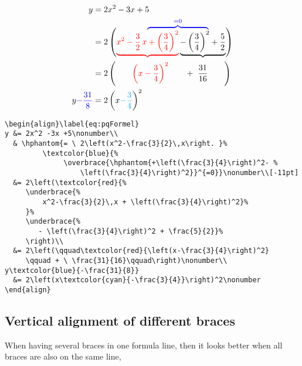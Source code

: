 \begin{table}[htb]
\begin{align}\label{eq:pqFormel}
y &= 2x^2 -3x +5\nonumber\\
  & \hphantom{= \ 2\left(x^2-\frac{3}{2}\,x\right. }%
         \textcolor{blue}{%
              \overbrace{\hphantom{+\left(\frac{3}{4}\right)^2- %
                  \left(\frac{3}{4}\right)^2}}^{=0}}\nonumber\\[-11pt]
  &= 2\left(\textcolor{red}{%
     \underbrace{%
         x^2-\frac{3}{2}\,x + \left(\frac{3}{4}\right)^2}%
     }%
     \underbrace{%
        - \left(\frac{3}{4}\right)^2 + \frac{5}{2}}%
     \right)\\
  &= 2\left(\qquad\textcolor{red}{\left(x-\frac{3}{4}\right)^2}
     \qquad + \ \frac{31}{16}\qquad\right)\nonumber\\
y\textcolor{blue}{-\frac{31}{8}}
  &= 2\left(x\textcolor{cyan}{-\frac{3}{4}}\right)^2\nonumber
\end{align}

\medskip%
\begin{lstlisting}
\begin{align}\label{eq:pqFormel}
y &= 2x^2 -3x +5\nonumber\\
  & \hphantom{= \ 2\left(x^2-\frac{3}{2}\,x\right. }%
         \textcolor{blue}{%
              \overbrace{\hphantom{+\left(\frac{3}{4}\right)^2- %
                  \left(\frac{3}{4}\right)^2}}^{=0}}\nonumber\\[-11pt]
  &= 2\left(\textcolor{red}{%
     \underbrace{%
         x^2-\frac{3}{2}\,x + \left(\frac{3}{4}\right)^2}%
     }%
     \underbrace{%
        - \left(\frac{3}{4}\right)^2 + \frac{5}{2}}%
     \right)\\
  &= 2\left(\qquad\textcolor{red}{\left(x-\frac{3}{4}\right)^2}
     \qquad + \ \frac{31}{16}\qquad\right)\nonumber\\
y\textcolor{blue}{-\frac{31}{8}}
  &= 2\left(x\textcolor{cyan}{-\frac{3}{4}}\right)^2\nonumber
\end{align}
\end{lstlisting}

\subsection[Vertical alignment]{Vertical alignment of different braces}
When having several braces in one formula line, then it looks better when all
braces are also on the same line, \eg


\end{table}
